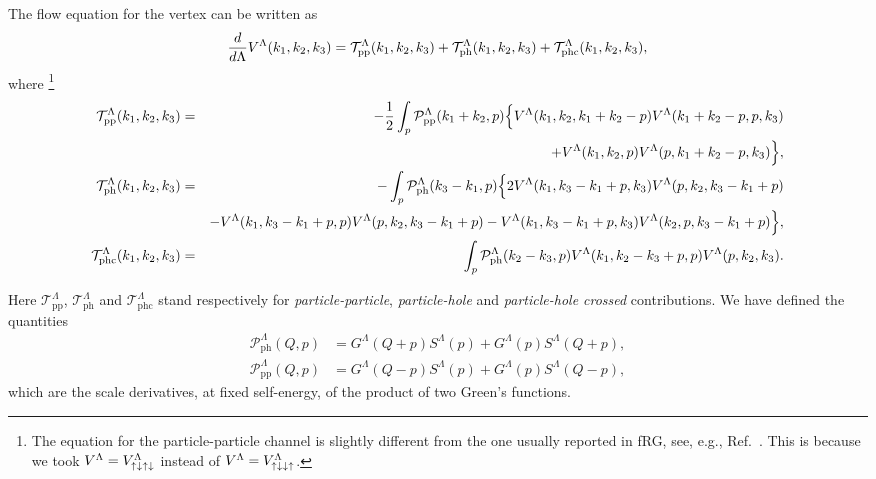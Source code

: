 \begin{widetext} 
The flow equation for the vertex can be written as \cite{Metzner2012, Husemann2009}
\begin{align}
\label{eq:vertflow}
 \frac{d}{d\Lambda}V^\Lambda(k_1,k_2,k_3) = \mathcal{T}^{\Lambda}_{\mathrm{pp} }(k_1,k_2,k_3) +  
  \mathcal{T}^{\Lambda}_{\mathrm{ph} }(k_1,k_2,k_3) + \mathcal{T}^{\Lambda}_{\mathrm{phc} }(k_1,k_2,k_3),
\end{align} 
where \footnote{The equation for the particle-particle channel is slightly different from the one usually reported in fRG, see, e.g., Ref.~. This is because we took $V^{\Lambda}_{\mathrm{} } = V^{\Lambda}_{\mathrm{\uparrow \downarrow \uparrow\downarrow} }$ instead of $V^{\Lambda}_{\mathrm{} } = V^{\Lambda}_{\mathrm{\uparrow\downarrow\downarrow\uparrow} }$.}
\begin{eqnarray}
\label{eq:ppT} 
\mathcal{T}^{\Lambda}_{\mathrm{pp} }(k_1,k_2,k_3) &=&-\frac{1}{2} \int_p \mathcal{P}^{\Lambda}_{\mathrm{\mathrm{pp}} }(k_1+k_2,p) \Big\{  V^{\Lambda}_{\mathrm{} }(k_1,k_2,k_1+k_2-p)V^{\Lambda}_{\mathrm{} }(k_1+k_2-p,p,k_3) 
\label{eq:tpp} 
   \\ 
\nonumber
&&+  V^{\Lambda}_{\mathrm{} }(k_1,k_2,p)V^{\Lambda}_{\mathrm{} }(p,k_1+k_2-p,k_3) \Big\} , \\  
\label{eq:tph} 
\mathcal{T} ^{\Lambda}_{\mathrm{ph} }(k_1,k_2,k_3) & =& -\int_p \mathcal{P}^{\Lambda}_{\mathrm{\mathrm{ph}} }(k_3-k_1,p)
\Big\{ 2 V^{\Lambda}_{\mathrm{} }( k_1,k_3-k_1+p,k_3)  V^{\Lambda}_{\mathrm{} }(p,k_2,k_3-k_1+p) \\
\nonumber
&&- V^{\Lambda}_{\mathrm{} }( k_1,k_3-k_1+p,p)  V^{\Lambda}_{\mathrm{} }(p,k_2,k_3-k_1+p) - V^{\Lambda}_{\mathrm{} }( k_1,k_3-k_1+p,k_3)  V^{\Lambda}_{\mathrm{} }(k_2,p,k_3-k_1+p) \Big\} , \\
\label{eq:tphc}
\mathcal{T}^{\Lambda}_{\mathrm{phc} }(k_1,k_2,k_3) & =& \int_p \mathcal{P}^{\Lambda}_{\mathrm{\mathrm{ph}} }(k_2-k_3,p) V^{\Lambda}_{\mathrm{} }(k_1,k_2-k_3+p,p)
V^{\Lambda}_{\mathrm{} }(p,k_2,k_3).
\end{eqnarray} 
\end{widetext}
Here $\mathcal{T}^\Lambda_{\mathrm{pp}}$, $\mathcal{T}^\Lambda_{\mathrm{ph}}$ and $\mathcal{T}^\Lambda_{\mathrm{phc}}$ stand respectively for \textit{particle-particle}, \textit{particle-hole} and \textit{particle-hole crossed} contributions.
We have defined the quantities
\begin{align}
 \mathcal{P}_{\mathrm{ph}}^\Lambda(Q,p) &= G^\Lambda(Q+p)S^\Lambda(p) + G^\Lambda(p) S^\Lambda(Q+p), \\ 
 \mathcal{P}_{\mathrm{pp}}^\Lambda(Q,p) &=G^\Lambda(Q-p)S^\Lambda(p) + G^\Lambda(p) S^\Lambda(Q-p) ,
\end{align} 
which are the scale derivatives, at fixed self-energy, of the product of two Green's functions.

